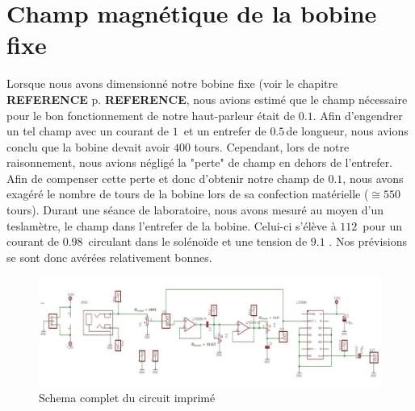 \section{Champ magnétique de la bobine fixe}
\label{mesures champ}
Lorsque nous avons dimensionné notre bobine fixe (voir le chapitre \textbf{REFERENCE} p. \textbf{REFERENCE}, nous avions estimé que le champ nécessaire pour le bon fonctionnement de notre haut-parleur était de $0.1$\tesla.  Afin d'engendrer un tel champ avec un courant de $1$\ampere \, et un entrefer de $0.5$\centi\meter \,de longueur, nous avions conclu que la bobine devait avoir $400$ tours. Cependant, lors de notre raisonnement, nous avions négligé la "perte" de champ en dehors de l'entrefer. Afin de compenser cette perte et donc d'obtenir notre champ de $0.1$\tesla, nous avons exagéré le nombre de tours de la bobine lors de sa confection matérielle ($\cong 550$ tours). 
Durant une séance de laboratoire, nous avons mesuré au moyen d'un teslamètre, le champ dans l'entrefer de la bobine. Celui-ci s'élève à $112$\milli \tesla \, pour un courant de $0.98$ \ampere \,circulant dans le solénoïde et une tension de $9.1$ \volt. Nos prévisions se sont donc avérées relativement bonnes.

\begin{figure}[h!]
\begin{center}
\includegraphics[width=\textwidth]{img/circuitcomplet} 
\end{center}
\caption{Schema complet du circuit imprimé}		
\label{circuitcomplet}		
\end{figure}